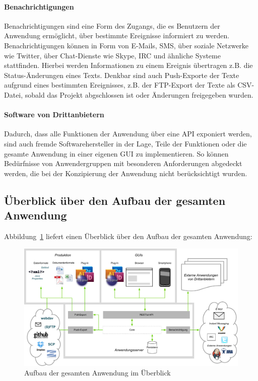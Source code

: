 \paragraph{Benachrichtigungen} Benachrichtigungen sind eine Form des Zugangs, die es Benutzern der Anwendung ermöglicht, über bestimmte Ereignisse informiert zu werden. Benachrichtigungen können in Form von E-Mails, SMS, über soziale Netzwerke wie Twitter, über Chat-Dienste wie Skype, IRC und ähnliche Systeme stattfinden. Hierbei werden Informationen zu einem Ereignis übertragen z.B. die Status-Änderungen eines Texts. Denkbar sind auch Push-Exporte der Texte aufgrund eines bestimmten Ereignisses, z.B. der FTP-Export der Texte als CSV-Datei, sobald das Projekt abgschlossen ist oder Änderungen freigegeben wurden.

\paragraph{Software von Drittanbietern} Dadurch, dass alle Funktionen der Anwendung über eine API exponiert werden, sind auch fremde Softwarehersteller in der Lage, Teile der Funktionen oder die gesamte Anwendung in einer eigenen GUI zu implementieren. So können Bedürfnisse von Anwendergruppen mit besonderen Anforderungen abgedeckt werden, die bei der Konzipierung der Anwendung nicht berücksichtigt wurden.

\pagebreak

\subsection{Überblick über den Aufbau der gesamten Anwendung}

Abbildung~\ref{chart:gesamtessystem} liefert einen Überblick über den Aufbau der gesamten Anwendung:

\begin{figure}[htb]
\begin{center}
\includegraphics[width=\textwidth]{media/GesamtesSystem.pdf}
\caption{Aufbau der gesamten Anwendung im Überblick}
\label{chart:gesamtessystem}
\end{center}
\end{figure}

